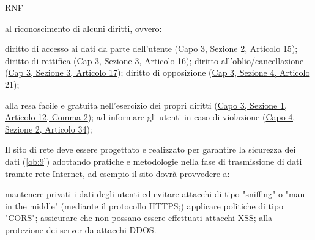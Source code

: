 \begin{listaPersonale}{RNF}
\begin{listaPersonale2}{}
         al riconoscimento di alcuni diritti, ovvero:
        \begin{listaPersonale3}{}
             diritto di accesso ai dati da parte dell'utente (\href{https://eur-lex.europa.eu/legal-content/IT/TXT/?uri=uriserv:OJ.L_.2016.119.01.0001.01.ITA&toc=OJ:L:2016:119:TOC#d1e2520-1-1}{Capo 3, Sezione 2, Articolo 15});
             diritto di rettifica (\href{https://eur-lex.europa.eu/legal-content/IT/TXT/?uri=uriserv:OJ.L_.2016.119.01.0001.01.ITA&toc=OJ:L:2016:119:TOC#d1e2606-1-1}{Cap 3, Sezione 3, Articolo 16});
            diritto all'oblio/cancellazione (\href{https://eur-lex.europa.eu/legal-content/IT/TXT/?uri=uriserv:OJ.L_.2016.119.01.0001.01.ITA&toc=OJ:L:2016:119:TOC#d1e2613-1-1}{Cap 3, Sezione 3, Articolo 17});
             diritto di opposizione (\href{https://eur-lex.europa.eu/legal-content/IT/TXT/?uri=uriserv:OJ.L_.2016.119.01.0001.01.ITA&toc=OJ:L:2016:119:TOC#d1e2810-1-1}{Cap 3, Sezione 4, Articolo 21});
        \end{listaPersonale3}

         alla resa facile e gratuita nell'esercizio dei propri diritti (\href{https://eur-lex.europa.eu/legal-content/IT/TXT/?uri=uriserv:OJ.L_.2016.119.01.0001.01.ITA&toc=OJ:L:2016:119:TOC#d1e2189-1-1}{Capo 3, Sezione 1, Articolo 12, Comma 2});
         ad informare gli utenti in caso di violazione (\href{https://eur-lex.europa.eu/legal-content/IT/TXT/?uri=uriserv:OJ.L_.2016.119.01.0001.01.ITA&toc=OJ:L:2016:119:TOC#d1e3497-1-1}{Capo 4, Sezione 2, Articolo 34});
    \end{listaPersonale2}


     Il sito di rete deve essere progettato e realizzato per garantire la sicurezza dei dati (\ref{ob:9}) adottando pratiche e metodologie nella fase di trasmissione di dati tramite rete Internet, ad esempio il sito dovrà provvedere a:
    \begin{listaPersonale2}{}
         mantenere privati i dati degli utenti ed evitare attacchi di tipo "sniffing" o "man in the middle" (mediante il protocollo HTTPS;)
         applicare politiche di tipo "CORS";
         assicurare che non possano essere effettuati attacchi XSS;
         alla protezione dei server da attacchi DDOS.
    \end{listaPersonale2}


\end{listaPersonale}
